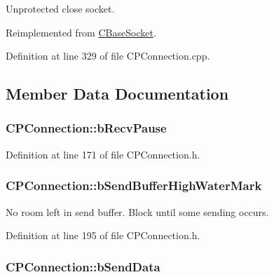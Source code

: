 \-Unprotected close socket. 



\-Reimplemented from \hyperlink{class_c_base_socket_ab3e4b93f8450b5fa901017d5fddba0e2}{\-C\-Base\-Socket}.



\-Definition at line 329 of file \-C\-P\-Connection.\-cpp.



\subsection{\-Member \-Data \-Documentation}
\hypertarget{class_c_p_connection_aafe1dacf5a3a4927f44435e887b5e177}{
\subsubsection[{b\-Recv\-Pause}]{ {\bf \-C\-P\-Connection\-::b\-Recv\-Pause}}}\label{class_c_p_connection_aafe1dacf5a3a4927f44435e887b5e177}


\-Definition at line 171 of file \-C\-P\-Connection.\-h.

\hypertarget{class_c_p_connection_a3f860ee09bae3ca5a8967f5d787d1f93}{
\subsubsection[{b\-Send\-Buffer\-High\-Water\-Mark}]{ {\bf \-C\-P\-Connection\-::b\-Send\-Buffer\-High\-Water\-Mark}}}\label{class_c_p_connection_a3f860ee09bae3ca5a8967f5d787d1f93}


\-No room left in send buffer. \-Block until some sending occurs. 



\-Definition at line 195 of file \-C\-P\-Connection.\-h.

\hypertarget{class_c_p_connection_ab1099445977c4cabbb67c86f6a0b9213}{
\subsubsection[{b\-Send\-Data}]{ {\bf \-C\-P\-Connection\-::b\-Send\-Data}}}\label{class_c_p_connection_ab1099445977c4cabbb67c86f6a0b9213}


